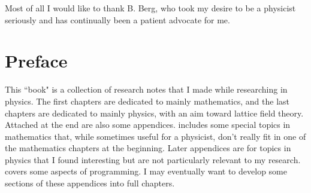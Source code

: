 \documentclass[12pt]{book}
\theoremstyle{definition}
\begin{document}
Most of all I would like to thank B. Berg, who took my desire to be a
physicist seriously and has continually been a patient advocate for me.

\chapter{Preface}
This ``book" is a collection of research notes that I made while researching in
physics. The first chapters are dedicated to mainly mathematics, and the last
chapters are dedicated to mainly physics, with an aim toward lattice field
theory. 
Attached at the end are also some appendices. 
 includes some special topics in mathematics 
that, while sometimes useful for a physicist, don't really fit in one of 
the mathematics chapters at the beginning.
Later appendices are for topics in physics that I found interesting but are
not particularly relevant to my research.
 covers some aspects of programming. 
I may eventually want
to develop some sections of these appendices into full chapters.


\tableofcontents                        %
\mainmatter                             %




%










\begin{appendices}



%


\end{appendices}


\printindex
\end{document}
